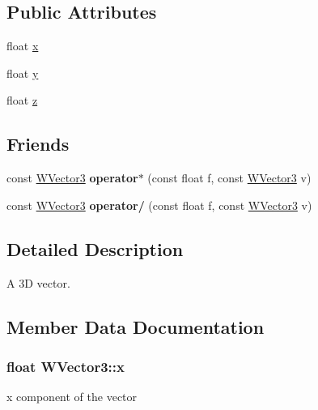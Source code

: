 \subsection*{Public Attributes}
\begin{DoxyCompactItemize}
\item 
float \hyperlink{class_w_vector3_a79d057d696196227f92c35331efb9da7}{x}
\item 
float \hyperlink{class_w_vector3_a2e4d4970827cd3c2bc17ae995b648b08}{y}
\item 
float \hyperlink{class_w_vector3_ac90f9885ea33f3f7adfc062c556dc191}{z}
\end{DoxyCompactItemize}
\subsection*{Friends}
\begin{DoxyCompactItemize}
\item 
const \hyperlink{class_w_vector3}{W\+Vector3} {\bfseries operator$\ast$} (const float f, const \hyperlink{class_w_vector3}{W\+Vector3} v)\hypertarget{class_w_vector3_a701e5c82ddf62ea34038ed6097b4c0d7}{}\label{class_w_vector3_a701e5c82ddf62ea34038ed6097b4c0d7}

\item 
const \hyperlink{class_w_vector3}{W\+Vector3} {\bfseries operator/} (const float f, const \hyperlink{class_w_vector3}{W\+Vector3} v)\hypertarget{class_w_vector3_a880507bd827c21ec8486e9263fef1319}{}\label{class_w_vector3_a880507bd827c21ec8486e9263fef1319}

\end{DoxyCompactItemize}


\subsection{Detailed Description}
A 3D vector. 

\subsection{Member Data Documentation}
\subsubsection[{\texorpdfstring{x}{x}}]{\setlength{\rightskip}{0pt plus 5cm}float W\+Vector3\+::x}\hypertarget{class_w_vector3_a79d057d696196227f92c35331efb9da7}{}\label{class_w_vector3_a79d057d696196227f92c35331efb9da7}
x component of the vector 
